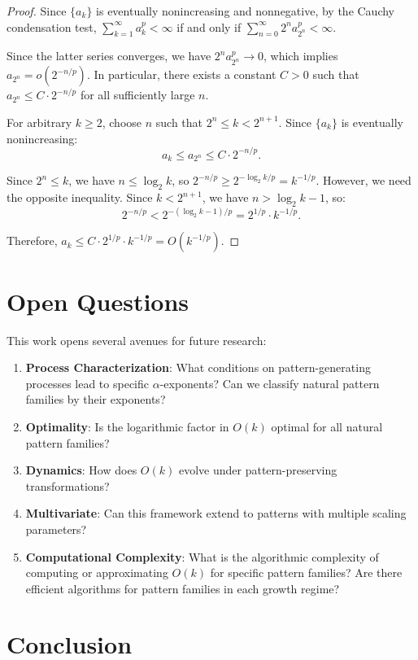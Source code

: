 \documentclass[11pt]{article}
\theoremstyle{definition}
\begin{document}
\begin{proof}
Since $\{a_k\}$ is eventually nonincreasing and nonnegative, by the Cauchy condensation test, $\sum_{k=1}^\infty a_k^p < \infty$ if and only if $\sum_{n=0}^\infty 2^n a_{2^n}^p < \infty$.

Since the latter series converges, we have $2^n a_{2^n}^p \to 0$, which implies $a_{2^n} = o(2^{-n/p})$. In particular, there exists a constant $C > 0$ such that $a_{2^n} \leq C \cdot 2^{-n/p}$ for all sufficiently large $n$.

For arbitrary $k \geq 2$, choose $n$ such that $2^n \leq k < 2^{n+1}$. Since $\{a_k\}$ is eventually nonincreasing:
$$a_k \leq a_{2^n} \leq C \cdot 2^{-n/p}.$$

Since $2^n \leq k$, we have $n \leq \log_2 k$, so $2^{-n/p} \geq 2^{-\log_2 k/p} = k^{-1/p}$. However, we need the opposite inequality. Since $k < 2^{n+1}$, we have $n > \log_2 k - 1$, so:
$$2^{-n/p} < 2^{-(\log_2 k - 1)/p} = 2^{1/p} \cdot k^{-1/p}.$$

Therefore, $a_k \leq C \cdot 2^{1/p} \cdot k^{-1/p} = O(k^{-1/p})$.
\end{proof}

\section{Open Questions}

This work opens several avenues for future research:

\begin{enumerate}
\item \textbf{Process Characterization}: What conditions on pattern-generating processes lead to specific $\alpha$-exponents? Can we classify natural pattern families by their exponents?
\item \textbf{Optimality}: Is the logarithmic factor in $O(k)$ optimal for all natural pattern families?
\item \textbf{Dynamics}: How does $O(k)$ evolve under pattern-preserving transformations?
\item \textbf{Multivariate}: Can this framework extend to patterns with multiple scaling parameters?
\item \textbf{Computational Complexity}: What is the algorithmic complexity of computing or approximating $O(k)$ for specific pattern families? Are there efficient algorithms for pattern families in each growth regime?
\end{enumerate}

\section{Conclusion}
\end{document}
